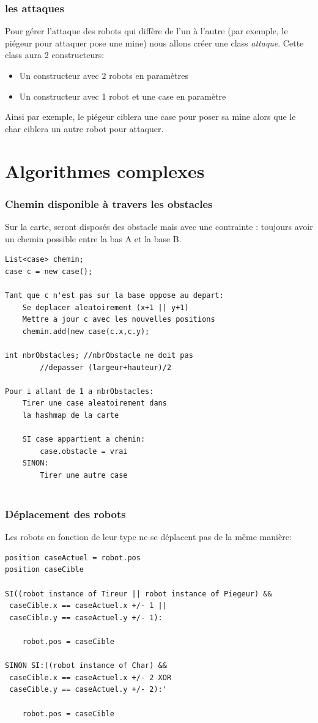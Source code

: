 \documentclass[12pt]{article}
\begin{document}
\section{les attaques}
Pour gérer l'attaque des robots qui diffère de l'un à l'autre (par exemple, le piégeur pour attaquer pose une mine) nous allons créer une class \emph{attaque}.
Cette class aura 2 constructeurs:
\begin{itemize}
\item Un constructeur avec 2 robots en paramètres
\item Un constructeur avec 1 robot et une case en paramètre
\end{itemize}
Ainsi par exemple, le piégeur ciblera une case pour poser sa mine alors que le char ciblera un autre robot pour attaquer.

\newpage
{}
\part*{Algorithmes complexes}
\setcounter{section}{0}

\section{Chemin disponible à travers les obstacles}
Sur la carte, seront disposés des obstacle mais avec une contrainte : toujours avoir un chemin possible entre la bas A et la base B.
\\
\begin{lstlisting}
List<case> chemin;
case c = new case();

Tant que c n'est pas sur la base oppose au depart:
	Se deplacer aleatoirement (x+1 || y+1)
	Mettre a jour c avec les nouvelles positions
	chemin.add(new case(c.x,c.y);

int nbrObstacles; //nbrObstacle ne doit pas 
		//depasser (largeur+hauteur)/2

Pour i allant de 1 a nbrObstacles:
	Tirer une case aleatoirement dans 
	la hashmap de la carte
	
	SI case appartient a chemin:
		case.obstacle = vrai
	SINON:
		Tirer une autre case
		
\end{lstlisting}
\newpage
\section{Déplacement des robots}
Les robots en fonction de leur type ne se déplacent pas de la même manière:
\begin{lstlisting}
position caseActuel = robot.pos
position caseCible

SI((robot instance of Tireur || robot instance of Piegeur) &&
 caseCible.x == caseActuel.x +/- 1 ||
 caseCible.y == caseActuel.y +/- 1):
	 
	robot.pos = caseCible

SINON SI:((robot instance of Char) && 
 caseCible.x == caseActuel.x +/- 2 XOR
 caseCible.y == caseActuel.y +/- 2):'
 
	robot.pos = caseCible
\end{lstlisting}
\end{document}
